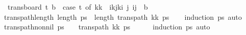 \begin{isabellebody}
\ \ {\isachardoublequoteopen}trans{\isacharunderscore}{\kern0pt}board\ t\ b\ {\isasymequiv}\ {\isacharparenleft}{\kern0pt}case\ t\ of\ {\isacharparenleft}{\kern0pt}kk\ {\isasymRightarrow}\ {\isacharbraceleft}{\kern0pt}{\isacharparenleft}{\kern0pt}i{\isacharplus}{\kern0pt}kj{\isacharplus}{\kern0pt}ki\ j{\isachardot}{\kern0pt}\ {\isacharparenleft}{\kern0pt}i{\isacharcomma}{\kern0pt}j{\isacharparenright}{\kern0pt}\ {\isasymin}\ b{\isacharbraceright}{\kern0pt}{\isacharparenright}{\kern0pt}{\isachardoublequoteclose}%
\isadelimdocument
%
\endisadelimdocument
%
\isatagdocument
%
\isamarkuptrue%
%
\endisatagdocument
{\isafolddocument}%
%
\isadelimdocument
%
\endisadelimdocument
{}\isamarkupfalse%
\ trans{\isacharunderscore}{\kern0pt}path{\isacharunderscore}{\kern0pt}length{\isacharcolon}{\kern0pt}\ {\isachardoublequoteopen}length\ ps\ {\isacharequal}{\kern0pt}\ length\ {\isacharparenleft}{\kern0pt}trans{\isacharunderscore}{\kern0pt}path\ {\isacharparenleft}{\kern0pt}kk\ ps{\isacharparenright}{\kern0pt}{\isachardoublequoteclose}\isanewline
%
\isadelimproof
\ \ %
\endisadelimproof
%
\isatagproof
{}\isamarkupfalse%
\ {\isacharparenleft}{\kern0pt}induction\ ps{\isacharparenright}{\kern0pt}\ auto%
\endisatagproof
{\isafoldproof}%
%
\isadelimproof
\isanewline
%
\endisadelimproof
\isanewline
{}\isamarkupfalse%
\ trans{\isacharunderscore}{\kern0pt}path{\isacharunderscore}{\kern0pt}non{\isacharunderscore}{\kern0pt}nil{\isacharcolon}{\kern0pt}\ {\isachardoublequoteopen}ps\ {\isasymnoteq}\ {\isacharbrackleft}{\kern0pt}{\isacharbrackright}{\kern0pt}\ {\isasymLongrightarrow}\ trans{\isacharunderscore}{\kern0pt}path\ {\isacharparenleft}{\kern0pt}kk\ ps\ {\isasymnoteq}\ {\isacharbrackleft}{\kern0pt}{\isacharbrackright}{\kern0pt}{\isachardoublequoteclose}\isanewline
%
\isadelimproof
\ \ %
\endisadelimproof
%
\isatagproof
{}\isamarkupfalse%
\ {\isacharparenleft}{\kern0pt}induction\ ps{\isacharparenright}{\kern0pt}\ auto%
\endisatagproof
{\isafoldproof}%
%
\isadelimproof
\isanewline
%
\endisadelimproof
\isanewline
{}\isamarkupfalse%

\end{isabellebody}
